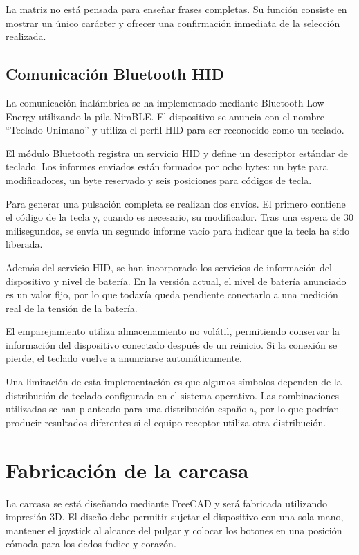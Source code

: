 La matriz no está pensada para enseñar frases completas. Su función consiste en mostrar un único carácter y ofrecer una confirmación inmediata de la selección realizada.

\subsection{Comunicación Bluetooth HID}
\label{subsec:implementacion-bluetooth}

La comunicación inalámbrica se ha implementado mediante Bluetooth Low Energy utilizando la pila NimBLE. El dispositivo se anuncia con el nombre \enquote{Teclado Unimano} y utiliza el perfil HID para ser reconocido como un teclado.

El módulo Bluetooth registra un servicio HID y define un descriptor estándar de teclado. Los informes enviados están formados por ocho bytes: un byte para modificadores, un byte reservado y seis posiciones para códigos de tecla.

Para generar una pulsación completa se realizan dos envíos. El primero contiene el código de la tecla y, cuando es necesario, su modificador. Tras una espera de 30 milisegundos, se envía un segundo informe vacío para indicar que la tecla ha sido liberada.

Además del servicio HID, se han incorporado los servicios de información del dispositivo y nivel de batería. En la versión actual, el nivel de batería anunciado es un valor fijo, por lo que todavía queda pendiente conectarlo a una medición real de la tensión de la batería.

El emparejamiento utiliza almacenamiento no volátil, permitiendo conservar la información del dispositivo conectado después de un reinicio. Si la conexión se pierde, el teclado vuelve a anunciarse automáticamente.

Una limitación de esta implementación es que algunos símbolos dependen de la distribución de teclado configurada en el sistema operativo. Las combinaciones utilizadas se han planteado para una distribución española, por lo que podrían producir resultados diferentes si el equipo receptor utiliza otra distribución.

\section{Fabricación de la carcasa}
\label{sec:fabricacion-carcasa}

La carcasa se está diseñando mediante FreeCAD y será fabricada utilizando impresión 3D. El diseño debe permitir sujetar el dispositivo con una sola mano, mantener el joystick al alcance del pulgar y colocar los botones en una posición cómoda para los dedos índice y corazón.

